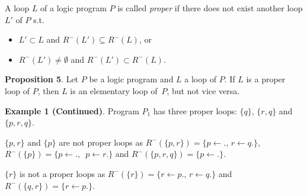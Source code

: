 \documentclass[landscape,final,a0paper,fontscale=0.285]{baposter}
\begin{document}
\begin{poster}
{    A loop $L$ of a logic program $P$ is called {\em proper} if there does not exist another loop $L'$ of $P$ s.t.
    \begin{itemize}
    \item $L'\subset L$ and $R^-(L')\subseteq R^-(L)$, or
    \item $R^-(L')\neq\emptyset$ and $R^-(L') \subset R^-(L)$.
    \end{itemize}

    \smallskip
    {\bf Proposition 5}.
    Let $P$ be a logic program and $L$ a loop of $P$. If $L$ is a proper loop of $P$, then $L$ is an elementary loop of~$P$, but not vice versa.

    \smallskip
    {\bf Example 1 (Continued)}.
    Program $P_1$ has three proper loops: $\{q\}$,
    $\{r, q\}$ and $\{p, r, q\}$.

    $\{p, r\}$ and $\{p\}$ are not proper loops as $R^-(\{p, r\}) = \{{p\gets.},\,{r\gets q.}\}$, $R^-(\{p\}) = \{ {p\gets.}, \,$ ${p\gets r.}\}$ and $R^-(\{p, r, q\}) = \{ {p\gets.}\}$.

    $\{r\}$ is not a proper loops as $R^-(\{r\}) = \{ {r\gets p.},\, {r\gets q.}\}$ and $R^-(\{q, r\}) = \{ {r\gets p.}\}$.

   \vspace{0.3em}
  }

\end{poster}
\end{document}
